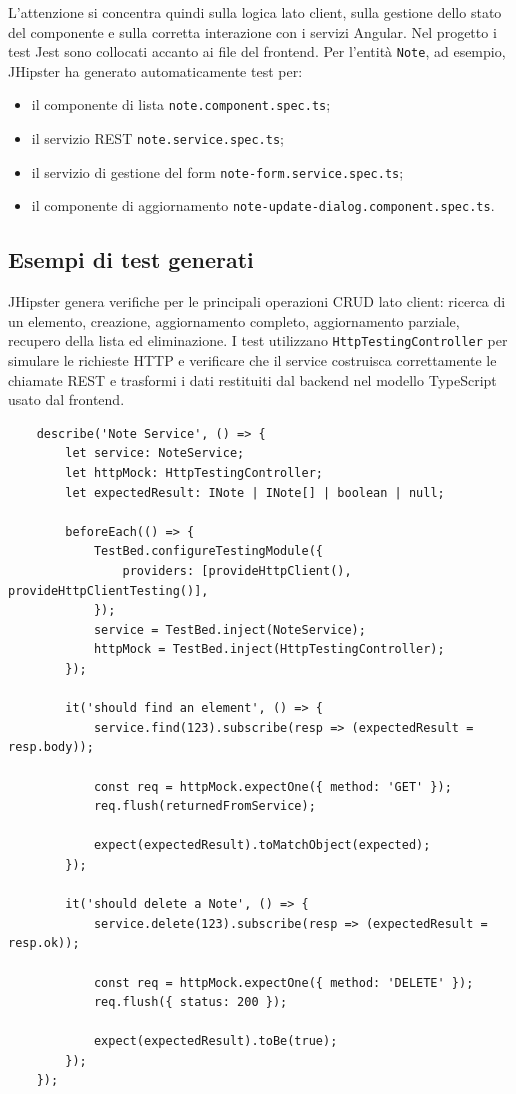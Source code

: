 L’attenzione si concentra quindi sulla logica lato client, sulla gestione dello stato del componente e sulla corretta interazione con i servizi Angular. Nel progetto i test Jest sono collocati accanto ai file del frontend. Per l’entità \texttt{Note}, ad esempio, JHipster ha generato automaticamente test per:
\begin{itemize}
	\item il componente di lista \texttt{note.component.spec.ts};
	\item il servizio REST \texttt{note.service.spec.ts};
	\item il servizio di gestione del form \texttt{note-form.service.spec.ts};
	\item il componente di aggiornamento \texttt{note-update-dialog.component.spec.ts}.
\end{itemize}

\subsection{Esempi di test generati}
\label{subsec:jest-esempi}

JHipster genera verifiche per le principali operazioni CRUD lato client: ricerca di un elemento, creazione, aggiornamento completo, aggiornamento parziale, recupero della lista ed eliminazione. I test utilizzano \texttt{HttpTestingController} per simulare le richieste HTTP e verificare che il service costruisca correttamente le chiamate REST e trasformi i dati restituiti dal backend nel modello TypeScript usato dal frontend.

\captionsetup{type=listing}
\label{lst:jest-note-service}
\begin{verbatim}
	describe('Note Service', () => {
		let service: NoteService;
		let httpMock: HttpTestingController;
		let expectedResult: INote | INote[] | boolean | null;
		
		beforeEach(() => {
			TestBed.configureTestingModule({
				providers: [provideHttpClient(), provideHttpClientTesting()],
			});
			service = TestBed.inject(NoteService);
			httpMock = TestBed.inject(HttpTestingController);
		});
		
		it('should find an element', () => {
			service.find(123).subscribe(resp => (expectedResult = resp.body));
			
			const req = httpMock.expectOne({ method: 'GET' });
			req.flush(returnedFromService);
			
			expect(expectedResult).toMatchObject(expected);
		});
		
		it('should delete a Note', () => {
			service.delete(123).subscribe(resp => (expectedResult = resp.ok));
			
			const req = httpMock.expectOne({ method: 'DELETE' });
			req.flush({ status: 200 });
			
			expect(expectedResult).toBe(true);
		});
	});
\end{verbatim}

